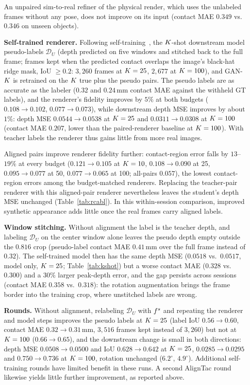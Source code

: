 An unpaired sim-to-real refiner of the physical render, which uses the unlabeled frames without any pose, does not improve on its input (contact MAE $0.349$ vs.\ $0.346$ on unseen objects).

\noindent\textbf{Self-trained renderer.} Following self-training~\cite{lee2013pseudo,xie2020noisy}, the $K$-shot downstream model pseudo-labels $\mathcal{D}_U$ (depth predicted on five windows and stitched back to the full frame; frames kept when the predicted contact overlaps the image's black-hat ridge mask, IoU $\ge0.2$: $3{,}260$ frames at $K=25$, $2{,}677$ at $K=100$), and GAN-$K$ is retrained on the $K$ true plus the pseudo pairs. The pseudo labels are as accurate as the labeler ($0.32$ and $0.24\,$mm contact MAE against the withheld GT labels), and the renderer's fidelity improves by $5\%$ at both budgets ($0.108\!\to\!0.102$, $0.077\!\to\!0.073$), while downstream depth MSE improves by about $1\%$: depth MSE $0.0544\!\to\!0.0538$ at $K=25$ and $0.0311\!\to\!0.0308$ at $K=100$ (contact MAE $0.207$, lower than the paired-renderer baseline at $K=100$). With teacher labels the renderer thus gains little from more real images.

Aligned pairs improve renderer fidelity further: contact-region error falls by $13$--$19\%$ at every budget ($0.121\!\to\!0.105$ at $K=10$, $0.108\!\to\!0.090$ at 25, $0.095\!\to\!0.077$ at 50, $0.077\!\to\!0.065$ at 100; all-pairs $0.057$), the lowest contact-region errors among the budget-matched renderers. Replacing the teacher-pair renderer with this aligned-pair renderer nevertheless leaves the student's depth MSE unchanged (Table~\ref{tab:rcabl}). In this within-session comparison, improved synthetic appearance adds little once the real frames carry aligned labels.

\noindent\textbf{Window stitching.} Without alignment the label is the teacher depth, and labeling $\mathcal{D}_U$ on the center window alone leaves the pseudo depth empty outside the $0.816$ crop (pseudo-label contact MAE $0.41\,$mm over the full frame instead of $0.32$). The self-trained model then has the same depth MSE ($0.0518$ vs.\ $0.0517$, model only, $K=25$; Table~\ref{tab:kshot}) but a worse contact MAE ($0.328$ vs.\ $0.300$) and a $30\%$ larger peak-depth error, and the gap persists across sessions (contact MAE $0.358$ vs.\ $0.318$): the rotation augmentation brings the frame border into the training crop, where unstitched labels are wrong.

\noindent\textbf{Rounds.} Without alignment, relabeling $\mathcal{D}_U$ with $f^{s}$ and repeating the renderer and model steps improves the pseudo labels at $K=25$ (label IoU $0.56\!\to\!0.60$, contact MAE $0.32\!\to\!0.31\,$mm, $3{,}516$ frames kept instead of $3{,}260$) but not at $K=100$ ($0.66\!\to\!0.65$), and the downstream change is small in both directions: depth MSE $0.0508\!\to\!0.0500$ and IoU $0.628\!\to\!0.642$ at $K=25$, $0.0285\!\to\!0.0295$ and $0.750\!\to\!0.736$ at $K=100$, rotation unchanged ($6.2^\circ$, $4.9^\circ$). Additional self-training rounds have limited benefit in these runs. A second AlignTac round likewise yields little further improvement, as reported above.


